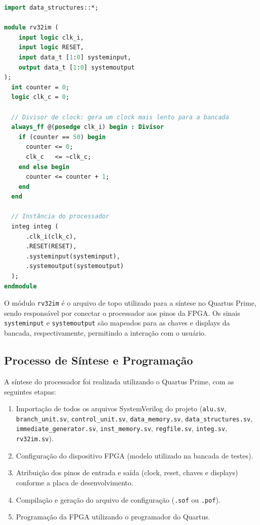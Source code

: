 \documentclass[
	12pt,				%
	oneside,
	a4paper,			%
	english,			%
	french,				%
	spanish,			%
	brazil,				%
	]{abntex2}
\begin{document}
\begin{lstlisting}[language=SystemVerilog, caption={Módulo rv32im.sv – topo para FPGA}, label={lst:rv32im}]
import data_structures::*;

module rv32im (
    input logic clk_i,
    input logic RESET,
    input data_t [1:0] systeminput,
    output data_t [1:0] systemoutput
);
  int counter = 0;
  logic clk_c = 0;

  // Divisor de clock: gera um clock mais lento para a bancada
  always_ff @(posedge clk_i) begin : Divisor
    if (counter == 50) begin
      counter <= 0;
      clk_c   <= ~clk_c;
    end else begin
      counter <= counter + 1;
    end
  end

  // Instância do processador
  integ integ (
      .clk_i(clk_c),
      .RESET(RESET),
      .systeminput(systeminput),
      .systemoutput(systemoutput)
  );
endmodule
\end{lstlisting}

O módulo \texttt{rv32im} é o arquivo de topo utilizado para a síntese no Quartus Prime, sendo responsável por conectar o processador aos pinos da FPGA. Os sinais \texttt{systeminput} e \texttt{systemoutput} são mapeados para as chaves e displays da bancada, respectivamente, permitindo a interação com o usuário.

\subsection{Processo de Síntese e Programação}

A síntese do processador foi realizada utilizando o Quartus Prime, com as seguintes etapas:

\begin{enumerate}
  \item Importação de todos os arquivos SystemVerilog do projeto (\texttt{alu.sv}, \texttt{branch\_unit.sv}, \texttt{control\_unit.sv}, \texttt{data\_memory.sv}, \texttt{data\_structures.sv}, \texttt{immediate\_generator.sv}, \texttt{inst\_memory.sv}, \texttt{regfile.sv}, \texttt{integ.sv}, \texttt{rv32im.sv}).
  \item Configuração do dispositivo FPGA (modelo utilizado na bancada de testes).
  \item Atribuição dos pinos de entrada e saída (clock, reset, chaves e displays) conforme a placa de desenvolvimento.
  \item Compilação e geração do arquivo de configuração (\texttt{.sof} ou \texttt{.pof}).
  \item Programação da FPGA utilizando o programador do Quartus.
\end{enumerate}
\end{document}
